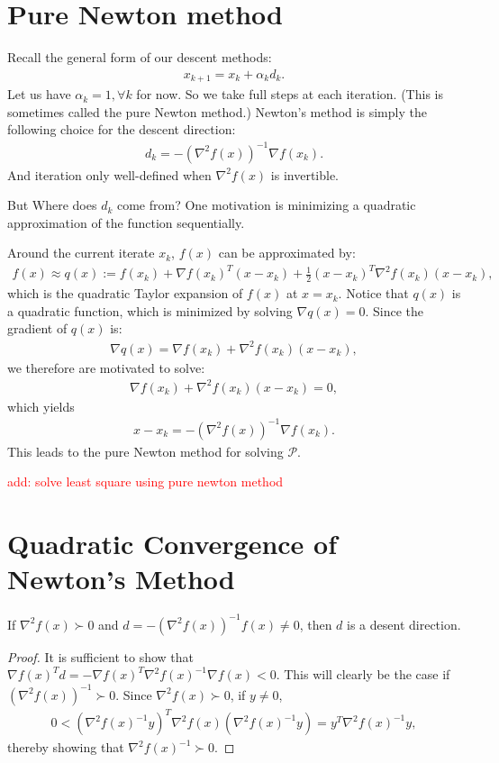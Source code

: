 \section{Pure Newton method }
Recall the general form of our descent methods:
\begin{align*}
    x_{k+1}=x_k+\alpha_kd_k.
\end{align*}
Let us have $\alpha_k=1,\forall k$ for now.  So we take full steps at
each iteration. (This is sometimes called the pure
Newton method.) Newton's method is simply the following choice for the
descent direction:
\begin{align*}
    d_k = -(\nabla^2 f(x))^{-1}\nabla f(x_k).
\end{align*}
And iteration only well-defined when $\nabla^2 f(x)$ is invertible.
\par 
But Where does $d_k$ come from? One motivation is minimizing a quadratic approximation of the function
sequentially. 
\par
Around the current iterate $x_k$, $f(x)$ can be approximated by:
\begin{align*}
    f(x)\approx q(x):= f(x_k)+\nabla f(x_k)^T(x-x_k)+\frac{1}{2}(x-x_k)^T\nabla^2f(x_k)(x-x_k),
\end{align*}
which is the quadratic Taylor expansion of $f(x)$ at $x = x_k$. Notice that $q(x)$ is a quadratic function, which is minimized by solving
$\nabla q(x) = 0$. Since the gradient of $q(x)$ is:
\begin{align*}
    \nabla q(x) = \nabla f(x_k) + \nabla^2 f(x_k)(x-x_k), 
\end{align*}
we therefore are motivated to solve:
\begin{align*}
    \nabla f(x_k) + \nabla^2 f(x_k)(x-x_k) = 0,
\end{align*}
which yields
\begin{align*}
    x-x_k = -(\nabla^2 f(x))^{-1}\nabla f(x_k). 
\end{align*}
This leads to the pure Newton method for solving $\mathcal{P}$.


\textcolor{red}{add: solve least square using pure newton method}

\section{Quadratic Convergence of Newton's Method}

\begin{proposition}{}{}
    If $\nabla^2 f(x)\succ 0$ and $d=-(\nabla^2 f(x))^{-1}f(x)\neq 0$, then $d$ is a desent direction. 
\end{proposition}
\begin{proof}
    It is sufficient to show that $\nabla f(x)^T d=-\nabla f(x)^T\nabla^2 f(x)^{-1}\nabla f(x)<0$. 
    This will clearly be the case if $(\nabla^2 f(x))^{-1}\succ 0$. Since $\nabla^2 f(x)\succ 0$, if $y\neq 0$,
    \begin{align*}
        0<(\nabla^2 f(x)^{-1} y)^T\nabla^2f(x)(\nabla^2 f(x)^{-1}y) = y^T\nabla^2 f(x)^{-1}y,
    \end{align*}
    thereby showing that $\nabla^2f(x)^{-1}\succ0$.
\end{proof}

